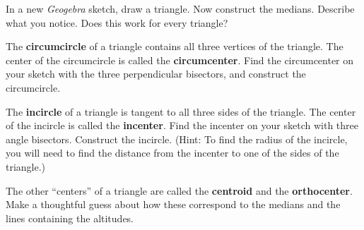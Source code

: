 \begin{prob}
In a new \textsl{Geogebra} sketch, draw a triangle. Now construct the medians.  Describe what you notice.  Does this work for every triangle?
\end{prob}

\begin{prob}
The \textbf{circumcircle} of a triangle contains all three vertices of the triangle.  The center of the circumcircle is called the \textbf{circumcenter}.  Find the circumcenter on your sketch with the three perpendicular bisectors, and construct the circumcircle.  
\end{prob}

\begin{prob}
The \textbf{incircle} of a triangle is tangent to all three sides of the triangle.  The center of the incircle is called the \textbf{incenter}.  
Find the incenter on your sketch with three angle bisectors. Construct the incircle.  (Hint:  To find the radius of the incircle, you will need to find the distance from the incenter to one of the sides of the triangle.)  
\end{prob}

\begin{prob}
The other ``centers'' of a triangle are called the \textbf{centroid} and the \textbf{orthocenter}.  Make a thoughtful guess about how these correspond to the medians and the lines containing the altitudes.  
\end{prob}


